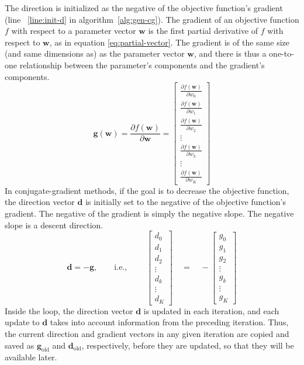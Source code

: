 The direction is initialized as the negative of the objective function's gradient
(line ~\ref{line:init-d} in algorithm~\ref{alg:gen-cg}). The gradient of an objective
function $f$ with respect to a parameter vector $\textbf{w}$ is the first partial derivative of $f$ with respect to
$\textbf{w}$, as in equation \eqref{eq:partial-vector}.  The gradient is of the same size (and same dimensions as) as the parameter vector $\textbf{w}$, and there is thus a one-to-one relationship between the parameter's components and the gradient's components.
\begin{equation}
\label{eq:partial-vector}
\textbf{g}(\mathbf{w}) = \frac{\partial f(\mathbf{w})}{\partial \mathbf{w}} =
  \begin{bmatrix}
    \frac{\partial f(\mathbf{w})}{\partial w_0}\\
    \frac{\partial f(\mathbf{w})}{\partial w_1} \\
    \frac{\partial f(\mathbf{w})}{\partial w_2}\\
    \vdots \\
	\frac{\partial f(\mathbf{w})}{\partial w_k}\\
	\vdots \\
	\frac{\partial f(\mathbf{w})}{\partial w_K}
  \end{bmatrix}
\end{equation}
In conjugate-gradient methods, if the goal is to decrease the objective function, the direction vector $\textbf{d}$  is initially set to the negative of the objective function's gradient. The negative of the gradient is simply the negative slope.  The negative slope is a descent direction. 
\begin{equation}
\textbf{d} = - \textbf{g}, \qquad \text{i.e., } \qquad
 \begin{bmatrix}
      d_0\\
    d_1 \\
   d_2\\
    \vdots \\
	d_k\\
	\vdots \\
	d_K
  \end{bmatrix} \quad =
\quad 
-\begin{bmatrix}
    g_0\\
    g_1 \\
   g_2\\
    \vdots \\
	g_k\\
	\vdots \\
	g_K
	\end{bmatrix}
  \end{equation}
Inside the loop, the direction vector $\textbf{d}$ is updated in each iteration, and each update to  $\textbf{d}$ 
takes into account information from the preceding iteration. Thus, the current direction and gradient vectors in any given iteration are copied and saved as $\textbf{g}_ {\text{old}}$ and $\textbf{d}_{\text{old}}$, respectively, before they are updated, so that they will be available later. 

